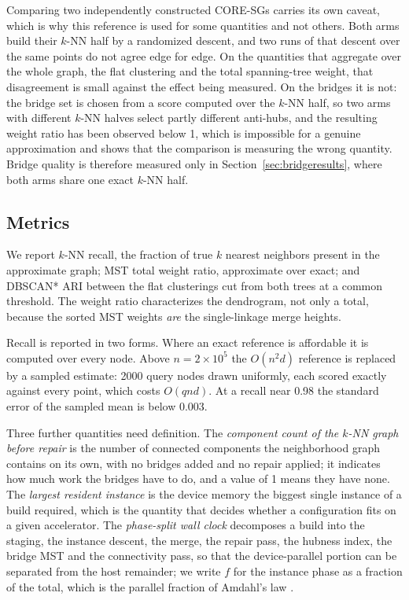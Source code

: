 \documentclass{ieeeaccess}
\begin{document}
Comparing two independently constructed CORE-SGs carries its own caveat, which
is why this reference is used for some quantities and not others. Both arms
build their $k$-NN half by a randomized descent, and two runs of that descent
over the same points do not agree edge for edge. On the quantities that
aggregate over the whole graph, the flat clustering and the total spanning-tree
weight, that disagreement is small against the effect being measured. On the
bridges it is not: the bridge set is chosen from a score computed over the
$k$-NN half, so two arms with different $k$-NN halves select partly different
anti-hubs, and the resulting weight ratio has been observed below 1, which is
impossible for a genuine approximation and shows that the comparison is measuring
the wrong quantity. Bridge quality is therefore measured only in
Section~\ref{sec:bridgeresults}, where both arms share one exact $k$-NN half.

\subsection{Metrics}
\label{sec:metrics}

We report $k$-NN recall, the fraction of true $k$ nearest neighbors present in
the approximate graph; MST total weight ratio, approximate over exact; and
DBSCAN* ARI \cite{ari} between the flat clusterings cut from both trees at a
common threshold. The weight ratio characterizes the dendrogram, not only a
total, because the sorted MST weights \emph{are} the single-linkage
merge heights.

Recall is reported in two forms. Where an exact reference is affordable it is
computed over every node. Above $n = 2\times10^5$ the $O(n^2 d)$ reference is
replaced by a sampled estimate: 2000 query nodes drawn uniformly, each scored
exactly against every point, which costs $O(q n d)$. At a recall near 0.98 the
standard error of the sampled mean is below 0.003.

Three further quantities need definition. The \emph{component count of the
$k$-NN graph before repair} is the number of connected components the
neighborhood graph contains on its own, with no bridges added and no repair
applied; it indicates how much work the bridges have to do, and a value of 1
means they have none. The \emph{largest resident instance} is the device memory
the biggest single instance of a build required, which is the quantity that
decides whether a configuration fits on a given accelerator. The
\emph{phase-split wall clock} decomposes a build into the staging, the instance
descent, the merge, the repair pass, the hubness index, the bridge MST and the
connectivity pass, so that the device-parallel portion can be separated from the
host remainder; we write $f$ for the instance phase as a fraction of the
total, which is the parallel fraction of Amdahl's law \cite{amdahl}.
\end{document}

